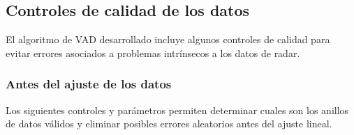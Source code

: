 \documentclass[12pt,spanish,oneside, a4paper]{book}
\begin{document}
\subsection{Controles de calidad de los
datos}\label{controles-de-calidad-de-los-datos}

El algoritmo de VAD desarrollado incluye algunos controles de calidad
para evitar errores asociados a problemas intrínsecos a los datos de
radar.

\subsubsection{Antes del ajuste de los
datos}\label{antes-del-ajuste-de-los-datos}

Los siguientes controles y parámetros permiten determinar cuales son los
anillos de datos válidos y eliminar posibles errores aleatorios antes
del ajuste lineal.
\end{document}
